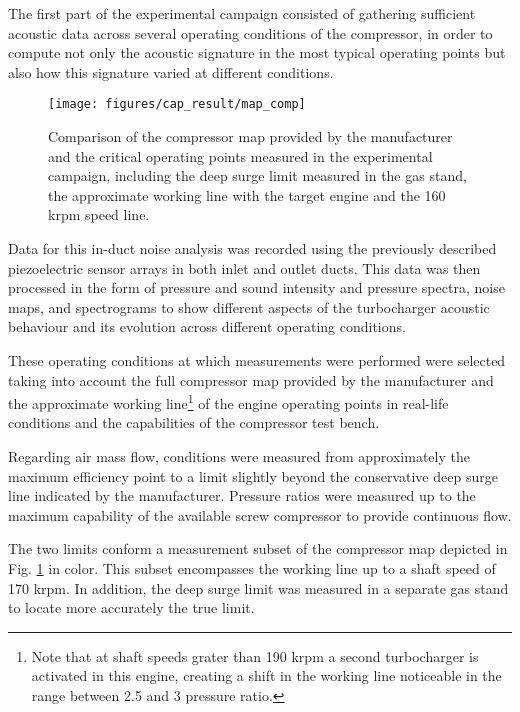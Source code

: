The first part of the experimental campaign consisted of gathering sufficient acoustic data across several operating conditions of the compressor, in order to compute not only the acoustic signature in the most typical operating points but also how this signature varied at different conditions.

\begin{figure}[tbh!]
\centering
\vspace{3mm}
\texttt{[image: figures/cap\_result/map\_comp]}
\caption[Manufacturer compressor map and measured points]{Comparison of the compressor map provided by the manufacturer and the critical operating points measured in the experimental campaign, including the deep surge limit measured in the gas stand, the approximate working line with the target engine and the 160 krpm speed line.}
\label{fig:result_map_comp}
\end{figure}

Data for this in-duct noise analysis was recorded using the previously described piezoelectric sensor arrays in both inlet and outlet ducts. This data was then processed in the form of pressure and sound intensity and pressure spectra, noise maps, and spectrograms to show different aspects of the turbocharger acoustic behaviour and its evolution across different operating conditions.

These operating conditions at which measurements were performed were selected taking into account the full compressor map provided by the manufacturer and the approximate working line\footnote{Note that at shaft speeds grater than 190 krpm a second turbocharger is activated in this engine, creating a shift in the working line noticeable in the range between 2.5 and 3 pressure ratio.} of the engine operating points in real-life conditions and the capabilities of the compressor test bench. 

Regarding air mass flow, conditions were measured from approximately the maximum efficiency point to a limit slightly beyond the conservative deep surge line indicated by the manufacturer. Pressure ratios were measured up to the maximum capability of the available screw compressor to provide continuous flow.

The two limits conform a measurement subset of the compressor map depicted in Fig. \ref{fig:result_map_comp} in color. This subset encompasses the working line up to a shaft speed of 170 krpm. In addition, the deep surge limit was measured in a separate gas stand to locate more accurately the true limit.

